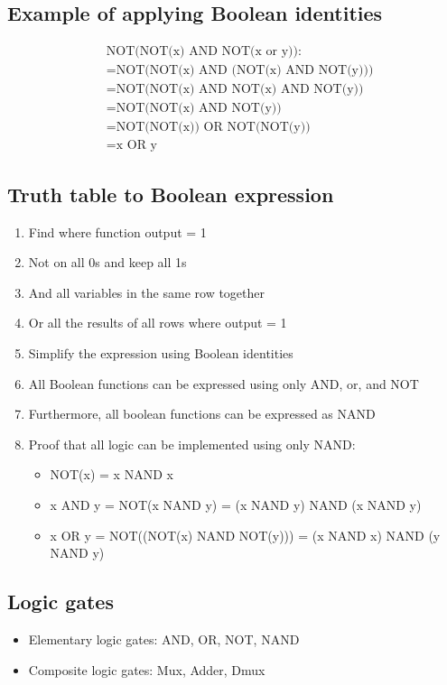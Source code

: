 \documentclass[12pt,a4paper]{article}
\begin{document}
\subsection{Example of applying Boolean identities}
\begin{align*}
        &   \text{NOT(NOT(x) AND NOT(x or y))}: \\
        & = \text{NOT(NOT(x) AND (NOT(x) AND NOT(y)))} \\
        & = \text{NOT(NOT(x) AND NOT(x) AND NOT(y))} \\
        & = \text{NOT(NOT(x) AND NOT(y))} \\
        & = \text{NOT(NOT(x)) OR NOT(NOT(y))} \\
        & = \text{x OR y}
\end{align*}

\subsection{Truth table to Boolean expression}
\begin{enumerate}
    \item Find where function output = 1
    \item Not on all 0s and keep all 1s
    \item And all variables in the same row together
    \item Or all the results of all rows where output = 1
    \item Simplify the expression using Boolean identities
    \item All Boolean functions can be expressed using only AND, or, and NOT
    \item Furthermore, all boolean functions can be expressed as NAND
    \item Proof that all logic can be implemented using only NAND:
    \begin{itemize}
        \item NOT(x) = x NAND x
        \item x AND y = NOT(x NAND y) = (x NAND y) NAND (x NAND y)
        \item x OR y = NOT((NOT(x) NAND NOT(y))) = (x NAND x) NAND (y NAND y)
    \end{itemize}
\end{enumerate}

\subsection{Logic gates}    
\begin{itemize}
    \item Elementary logic gates: AND, OR, NOT, NAND
    \item Composite logic gates: Mux, Adder, Dmux
\end{itemize}
\end{document}
